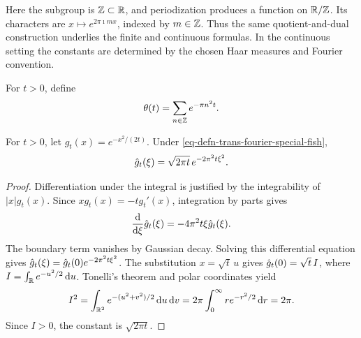 \begin{rem}
Here the subgroup is $\mathbb{Z}\subset\mathbb{R}$, and periodization produces a function
on $\mathbb{R}/\mathbb{Z}$. Its characters are $x\mapsto e^{2\pi\imath mx}$, indexed by
$m\in\mathbb{Z}$. Thus the same quotient-and-dual construction underlies the
finite and continuous formulas. In the continuous setting the constants
are determined by the chosen Haar measures and Fourier convention.
\end{rem}


\begin{defn}
For $t>0$, define
\[
 \theta(t)=\sum_{n\in\mathbb{Z}}e^{-\pi n^2t}.
\]
\end{defn}


\begin{lem}
\label{lem-tf-gaussienne}
For $t>0$, let $g_t(x)=e^{-x^2/(2t)}$. Under
\eqref{eq-defn-trans-fourier-special-fish},
\[
 \hat{g}_t(\xi)=\sqrt{2\pi t}\,e^{-2\pi^2t\xi^2}.
\]
\end{lem}
\begin{proof}
Differentiation under the integral is justified by the integrability of
$|x|g_t(x)$. Since $xg_t(x)=-tg_t'(x)$, integration by parts gives
\[
 \frac{\mathrm{d}}{\mathrm{d}\xi}\hat{g}_t(\xi)=-4\pi^2t\xi\hat{g}_t(\xi).
\]
The boundary term vanishes by Gaussian decay. Solving this differential
equation gives $\hat{g}_t(\xi)=\hat{g}_t(0)e^{-2\pi^2t\xi^2}$.
The substitution $x=\sqrt t\,u$ gives $\hat{g}_t(0)=\sqrt t\,I$, where
$I=\int_{\mathbb{R}} e^{-u^2/2}\,\mathrm{d} u$. Tonelli's theorem and polar coordinates yield
\[
 I^2=\int_{\mathbb{R}^2}e^{-(u^2+v^2)/2}\,\mathrm{d} u\,\mathrm{d} v
 =2\pi\int_0^\infty re^{-r^2/2}\,\mathrm{d} r=2\pi.
\]
Since $I>0$, the constant is $\sqrt{2\pi t}$.
\end{proof}


